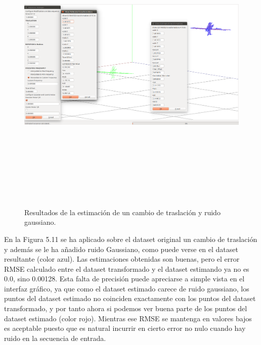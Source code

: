 \begin{figure}[H]
\begin{center}
\label{fig:opciones de View}\includegraphics[height=14.0cm,width=18.0cm]{img/cap6/Trasla_GaussNoise_abba.png}
\hspace{0.5cm}

\end{center}

\caption{Resultados de la estimación de un cambio de traslación y ruido gaussiano.}
\end{figure}
En la Figura 5.11 se ha aplicado sobre el dataset original un cambio de traslación y además se le ha añadido ruido Gaussiano, como puede verse en el dataset resultante (color azul). Las estimaciones obtenidas son buenas, pero el error RMSE calculado entre el dataset transformado y el dataset estimando ya no es 0.0, sino 0.00128. Esta falta de precisión puede apreciarse a simple vista en el interfaz gráfico, ya que como el dataset estimado carece de ruido gaussiano, los puntos del dataset estimado no coinciden exactamente con los puntos del dataset transformado, y por tanto ahora si podemos ver buena parte de los puntos del dataset estimado (color rojo).
Mientras ese RMSE se mantenga en valores bajos es aceptable puesto que es natural incurrir en cierto error no nulo cuando hay ruido en la secuencia de entrada.

